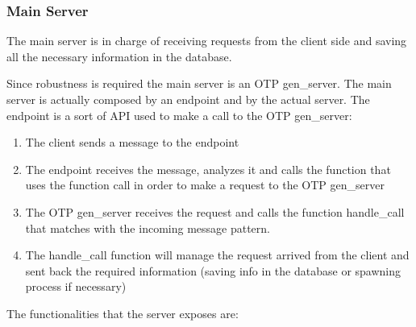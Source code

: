 \subsubsection{Main Server}
\noindent The main server is in charge of receiving requests from the client side and saving all the necessary information in the database.

\noindent Since robustness is required the main server is an OTP gen\_server. The main server is actually composed by an endpoint and by the actual server. The endpoint is a sort of API used to make a call to the OTP gen\_server:
\begin{enumerate}
	\item The client sends a message to the endpoint
	\item The endpoint receives the message, analyzes it and calls the function that uses the function call in order to make a request to the OTP gen\_server
	\item The OTP gen\_server receives the request and calls the function handle\_call that matches with the incoming message pattern.
	\item The handle\_call function will manage the request arrived from the client and sent back the required information (saving info in the database or spawning process if necessary)
\end{enumerate}
\noindent The functionalities that the server exposes are:
